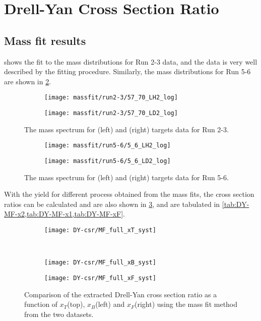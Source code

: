 \documentclass[../main.tex]{subfiles}
\begin{document}
\ifSubfilesClassLoaded{
	\mainmatter
	\setcounter{chapter}{6}
}{}

\section{Drell-Yan Cross Section Ratio}
\subsection{Mass fit results}
 shows the fit to the mass distributions for Run 2-3 data, and the
data is very well described by the fitting procedure. Similarly, the mass distributions for Run 5-6
are shown in \cref{fig:massfit_integrated_run56}.
\begin{figure}[h!]
	\begin{subfigure}{0.45\linewidth}
		\texttt{[image: massfit/run2-3/57\_70\_LH2\_log]}
	\end{subfigure}
	\begin{subfigure}{0.45\linewidth}
		\texttt{[image: massfit/run2-3/57\_70\_LD2\_log]}
	\end{subfigure}
	\caption{The mass spectrum for (left) and (right) targets data for Run 2-3.}
	\label{fig:massfit_integrated_run23}
\end{figure}
\begin{figure}[h!]
	\begin{subfigure}{0.45\linewidth}
		\texttt{[image: massfit/run5-6/5\_6\_LH2\_log]}
	\end{subfigure}
	\begin{subfigure}{0.45\linewidth}
		\texttt{[image: massfit/run5-6/5\_6\_LD2\_log]}
	\end{subfigure}
	\caption{The mass spectrum for (left) and (right) targets data for Run 5-6.}
	\label{fig:massfit_integrated_run56}
\end{figure}
With the yield for different process obtained from the mass fits, the cross section ratios can be calculated
and are also shown in \cref{fig:CSR_MF}, and are tabulated in \cref{tab:DY-MF-x2,tab:DY-MF-x1,tab:DY-MF-xF}.
\begin{figure}[h!]
	\centering
	\begin{subfigure}{0.6\linewidth}
		\texttt{[image: DY-csr/MF\_full\_xT\_syst]}
	\end{subfigure}\\
	\begin{subfigure}{0.45\linewidth}
		\texttt{[image: DY-csr/MF\_full\_xB\_syst]}
	\end{subfigure}
	\begin{subfigure}{0.45\linewidth}
		\texttt{[image: DY-csr/MF\_full\_xF\_syst]}
	\end{subfigure}
	\caption{Comparison of the extracted Drell-Yan cross section ratio as a function of $x_T$(top),
		$x_B$(left) and $x_F$(right) using the mass fit method from the two datasets.}
	\label{fig:CSR_MF}
\end{figure}
\end{document}
